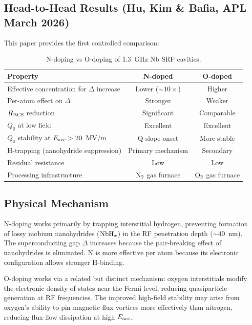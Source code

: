 \documentclass[11pt]{article}
\theoremstyle{definition}
\theoremstyle{remark}
\begin{document}
\subsection{Head-to-Head Results (Hu, Kim \& Bafia, APL March 2026)}

This paper provides the first controlled comparison:

\begin{table}[H]
\centering
\caption{N-doping vs O-doping of 1.3~GHz Nb SRF cavities.}
\renewcommand{\arraystretch}{1.3}
\begin{tabular}{p{4cm}cc}
\toprule
\textbf{Property} & \textbf{N-doped} & \textbf{O-doped} \\
\midrule
Effective concentration for $\Delta$ increase & Lower ($\sim 10\times$) & Higher \\
Per-atom effect on $\Delta$ & Stronger & Weaker \\
$R_{\rm BCS}$ reduction & Significant & Comparable \\
$Q_0$ at low field & Excellent & Excellent \\
$Q_0$ stability at $E_{\rm acc} > 20$~MV/m & Q-slope onset & More stable \\
H-trapping (nanohydride suppression) & Primary mechanism & Secondary \\
Residual resistance & Low & Low \\
Processing infrastructure & ${\rm N}_2$ gas furnace & ${\rm O}_2$ gas furnace \\
\bottomrule
\end{tabular}
\end{table}

\subsection{Physical Mechanism}

N-doping works primarily by trapping interstitial hydrogen, preventing
formation of lossy niobium nanohydrides (${\rm NbH}_x$) in the
RF penetration depth ($\sim 40$~nm). The superconducting gap
$\Delta$ increases because the pair-breaking effect of nanohydrides
is eliminated. N is more effective per atom because its electronic
configuration allows stronger H-binding.

O-doping works via a related but distinct mechanism: oxygen
interstitials modify the electronic density of states near the Fermi
level, reducing quasiparticle generation at RF frequencies. The
improved high-field stability may arise from oxygen's ability to pin
magnetic flux vortices more effectively than nitrogen, reducing
flux-flow dissipation at high $E_{\rm acc}$.
\end{document}
